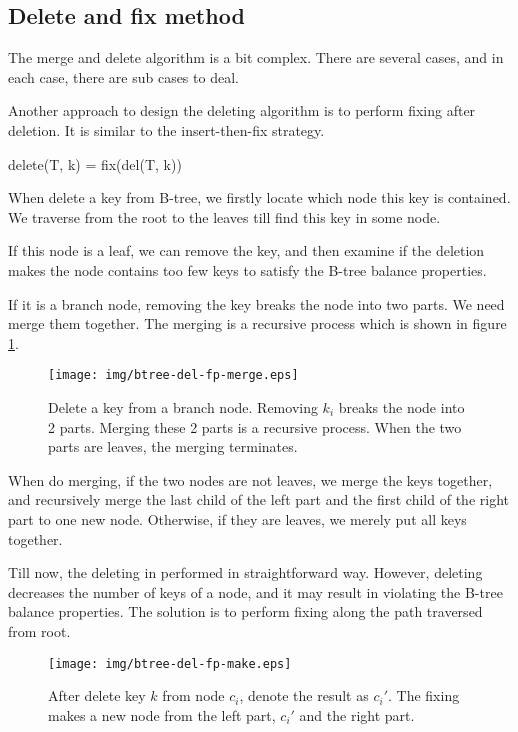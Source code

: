 \documentclass{article}
\begin{document}
\subsection{Delete and fix method}

The merge and delete algorithm is a bit complex.
There are several cases, and in each case, there are sub cases to deal.

Another approach to design the deleting algorithm is to perform fixing
after deletion. It is similar to the insert-then-fix strategy.

\be
delete(T, k) = fix(del(T, k))
\ee

When delete a key from B-tree, we firstly locate
which node this key is contained. We traverse
from the root to the leaves till find this key in some node.

If this node is a leaf, we can remove the key, and then
examine if the deletion makes the node contains too few keys to
satisfy the B-tree balance properties.

If it is a branch node, removing the key breaks the node into
two parts. We need merge them together. The merging is a recursive
process which is shown in figure \ref{fig:del-fp-merge}.

\begin{figure}[htbp]
  \centering
  \texttt{[image: img/btree-del-fp-merge.eps]}
  \caption{Delete a key from a branch node. Removing $k_i$ breaks
the node into 2 parts. Merging these 2 parts
is a recursive process. When the two parts are leaves, the merging
terminates.} \label{fig:del-fp-merge}
\end{figure}

When do merging, if the two nodes are not leaves, we merge the keys
together, and recursively merge the last child of the left part
and the first child of the right part to one new node. Otherwise,
if they are leaves, we merely put all keys together.

Till now, the deleting in performed in straightforward way. However, deleting
decreases the number of keys of a node, and it may result in
violating the B-tree balance properties. The solution is to perform
fixing along the path traversed from root.

\begin{figure}[htbp]
  \centering
  \texttt{[image: img/btree-del-fp-make.eps]}
  \caption{After delete key $k$ from node $c_i$, denote the result
as $c_i'$. The fixing makes a new node from the
left part, $c_i'$ and the right part.}
  \label{fig:del-fp-make}
\end{figure}
\end{document}
